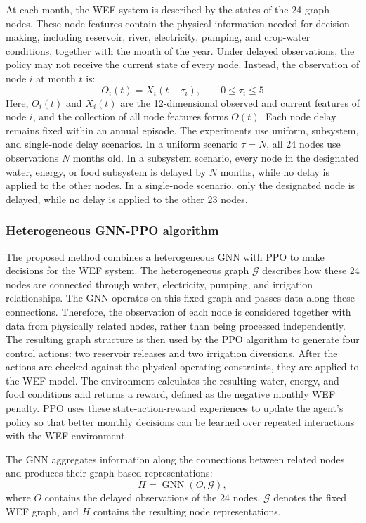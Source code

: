 \documentclass [a4paper,fleqn] {cas-dc}
\begin{document}
At each month, the WEF system is described by the states of the 24 graph nodes. These node features contain the physical information needed for decision making, including reservoir, river, electricity, pumping, and crop-water conditions, together with the month of the year. Under delayed observations, the policy may not receive the current state of every node. Instead, the observation of node $i$ at month $t$ is:
\begin{equation}
  O_i(t)=X_i(t-\tau_i),
  \qquad 0\leq\tau_i\leq5 
  \label{eq:policy-state}
\end{equation}
Here, $O_i(t)$ and $X_i(t)$ are the 12-dimensional observed and current features of node $i$, and the collection of all node features forms $O(t)$. Each node delay remains fixed within an annual episode. The experiments use uniform, subsystem, and single-node delay scenarios. In a uniform scenario $\tau=N$, all 24 nodes use observations $N$ months old. In a subsystem scenario, every node in the designated water, energy, or food subsystem is delayed by $N$ months, while no delay is applied to the other nodes. In a single-node scenario, only the designated node is delayed, while no delay is applied to the other 23 nodes.
\subsubsection{Heterogeneous GNN-PPO algorithm}
\label{sec32}

The proposed method combines a heterogeneous GNN with PPO to make decisions for the WEF system. The heterogeneous graph $\mathcal G$ describes how these 24 nodes are connected through water, electricity, pumping, and irrigation relationships. The GNN operates on this fixed graph and passes data along these connections. Therefore, the observation of each node is considered together with data from physically related nodes, rather than being processed independently. The resulting graph structure is then used by the PPO algorithm to generate four control actions: two reservoir releases and two irrigation diversions. After the actions are checked against the physical operating constraints, they are applied to the WEF model. The environment calculates the resulting water, energy, and food conditions and returns a reward, defined as the negative monthly WEF penalty. PPO uses these state-action-reward experiences to update the agent's policy so that better monthly decisions can be learned over repeated interactions with the WEF environment.

The GNN aggregates information along the connections between related nodes and produces their graph-based representations:
\begin{equation}
  H=\operatorname{GNN}(O,\mathcal G),
  \label{eq:gnn-encoding}
\end{equation}
where $O$ contains the delayed observations of the 24 nodes, $\mathcal G$ denotes the fixed WEF graph, and $H$ contains the resulting node representations.
\end{document}
